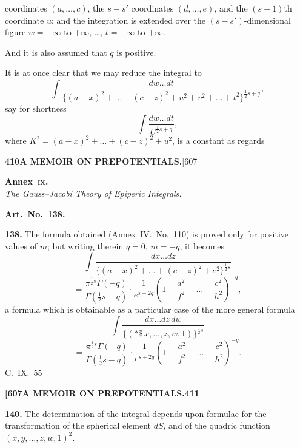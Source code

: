 \documentclass[11pt,a4paper]{article}
\begin{document}
{coordinates $(a, \ldots, c)$, the $s-s'$ coordinates $(d, \ldots, e)$, and the $(s+1)$th coordinate $u$: and the integration is extended over the $(s-s')$-dimensional figure $w = -\infty$ to $+\infty$, \ldots, $t = -\infty$ to $+\infty$.

And it is also assumed that $q$ is positive.

It is at once clear that we may reduce the integral to
\[
\int \frac{dw\ldots dt}{\{(a-x)^2 + \ldots + (c-z)^2 + u^2 + v^2 + \ldots + t^2\}^{\frac{1}{2}s+q}},
\]
say for shortness
\[
\int \frac{dw\ldots dt}{U^{\frac{1}{2}s+q}},
\]
where $K^2 = (a-x)^2 + \ldots + (c-z)^2 + u^2$, is a constant as regards

\newpage
\noindent\textbf{410}\hspace{\fill}\textbf{A MEMOIR ON PREPOTENTIALS.}\hspace{\fill}[607

\noindent\textbf{Annex~\textsc{ix.}}\\
\textit{The Gauss--Jacobi Theory of Epiperic Integrals.}

\medskip
\noindent\textbf{Art.~No.~138.}

\noindent\textbf{138.}
The formula obtained (Annex~IV.\ No.~110) is proved only for positive values of $m$; but writing therein $q = 0$, $m = -q$, it becomes
\[
\int \frac{dx\ldots dz}{\{(a-x)^2 + \ldots + (c-z)^2 + e^2\}^{\frac{1}{2}s}}
\]
\[
= \frac{\pi^{\frac{1}{2}s}\Gamma(-q)}{\Gamma(\frac{1}{2}s-q)} \cdot \frac{1}{e^{s+2q}} \left(1 - \frac{a^2}{f^2} - \ldots - \frac{c^2}{h^2}\right)^{-q},
\]
a formula which is obtainable as a particular case of the more general formula
\[
\int \frac{dx\ldots dz\, dw}{\{(*\!\!\$\, x, \ldots, z, w, 1)\}^{\frac{1}{2}s}}
\]
\[
= \frac{\pi^{\frac{1}{2}s}\Gamma(-q)}{\Gamma(\frac{1}{2}s-q)} \cdot \frac{1}{e^{s+2q}} \left(1 - \frac{a^2}{f^2} - \ldots - \frac{c^2}{h^2}\right)^{-q}.
\]
\hfill C.~IX.\ 55

\newpage
\noindent\textbf{[607}\hspace{\fill}\textbf{A MEMOIR ON PREPOTENTIALS.}\hspace{\fill}\textbf{411}

\noindent\textbf{140.}
The determination of the integral depends upon formulae for the transformation of the spherical element $dS$, and of the quadric function $(x, y, \ldots, z, w, 1)^2$.

}
\end{document}
